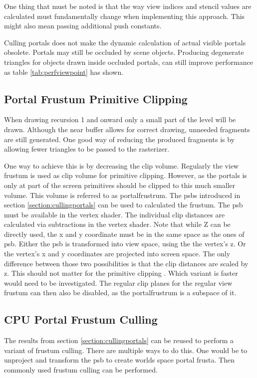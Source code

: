 One thing that must be noted is that the way view indices and stencil values are calculated must fundamentally change when implementing this approach. This might also mean passing additional push constants.

Culling portals does not make the dynamic calculation of actual visible portals obsolete. Portals may still be occluded by scene objects. Producing degenerate triangles for objects drawn inside occluded portals, can still improve performance as table \ref{tab:perfviewpoint} has shown.

\subsection{Portal Frustum Primitive Clipping}
\label{section:portalprimitiveclipping}

When drawing recursion 1 and onward only a small part of the level will be drawn. Although the near buffer allows for correct drawing, unneeded fragments are still generated. One good way of reducing the produced fragments is by allowing fewer triangles to be passed to the rasterizer. 

One way to achieve this is by decreasing the clip volume. Regularly the view frustum is used as clip volume for primitive clipping. However, as the portals is only at part of the screen primitives should be clipped to this much smaller volume. This volume is referred to as \gls{portalfrustrum}. The \glspl{psb} introduced in section \ref{section:cullingportals} can be used to calculated the frustum. The \gls{psb} must be available in the vertex shader. The individual clip distances are calculated via subtractions in the vertex shader. Note that while Z can be directly used, the  x and y coordinate must be in the same space as the ones of \gls{psb}. Either the \gls{psb} is transformed into view space, using the the vertex's z. Or the vertex's x and y coordinates are projected into screen space. The only difference between those two possibilities is that the clip distances are scaled by z. This should not matter for the primitive clipping \cite{khronos:vulkan:spec1.1}.  Which variant is faster would need to be investigated. The regular clip planes for the regular view frustum can then also be disabled, as the \gls{portalfrustrum} is a subspace of it.

\subsection{CPU Portal Frustum Culling}
The results from section \ref{section:cullingportals} can be reused to perform a variant of frustum culling. There are multiple ways to do this. One would be to unproject and transform the \gls{psb} to create worlds space portal frusta. Then commonly used frustum culling can be performed.

